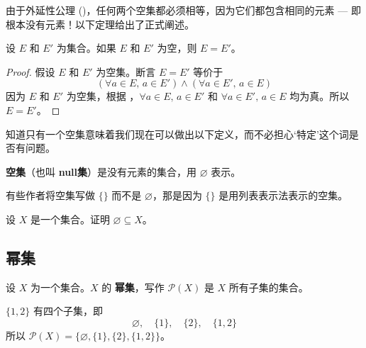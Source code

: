 由于外延性公理 ()，任何两个空集都必须相等，因为它们都包含相同的元素 --- 即根本没有元素！以下定理给出了正式阐述。

\begin{theorem}
\label{thmEmptySetIsUnique}
设 $E$ 和 $E'$ 为集合。如果 $E$ 和 $E'$ 为空，则 $E=E'$。
\end{theorem}
\begin{proof}
假设 $E$ 和 $E'$ 为空集。断言 $E=E'$ 等价于
\[ (\forall a \in E,\, a \in E') \wedge (\forall a \in E',\, a \in E) \]
因为 $E$ 和 $E'$ 为空集，根据 ，$\forall a \in E,\, a \in E'$ 和 $\forall a \in E',\, a \in E$ 均为真。所以 $E=E'$。
\end{proof}

知道只有一个空集意味着我们现在可以做出以下定义，而不必担心`特定'这个词是否有问题。

\begin{definition}
\label{defEmptySet}
\textbf{空集}（也叫 \textbf{null集}）是没有元素的集合，用 $\varnothing$  表示。
\end{definition}

有些作者将空集写做 $\{ \}$ 而不是 $\varnothing$，那是因为 $\{ \}$ 是用列表表示法表示的空集。

\begin{exercise}
\label{exEmptySetSubsetOfEverySet}
设 $X$ 是一个集合。证明 $\varnothing \subseteq X$。
\end{exercise}

\subsection*{幂集}

\begin{definition}
\label{defPowerSet}
设 $X$ 为一个集合。$X$ 的 \textbf{幂集}，写作 $\mathcal{P}(X)$  是 $X$ 所有子集的集合。
\end{definition}

\begin{example}
$\{ 1, 2 \}$ 有四个子集，即
\[ \varnothing, \quad \{ 1 \}, \quad \{ 2 \}, \quad \{ 1, 2 \} \]
所以 $\mathcal{P}(X) = \{\varnothing, \{ 1 \}, \{ 2 \}, \{ 1, 2 \}\}$。
\end{example}

